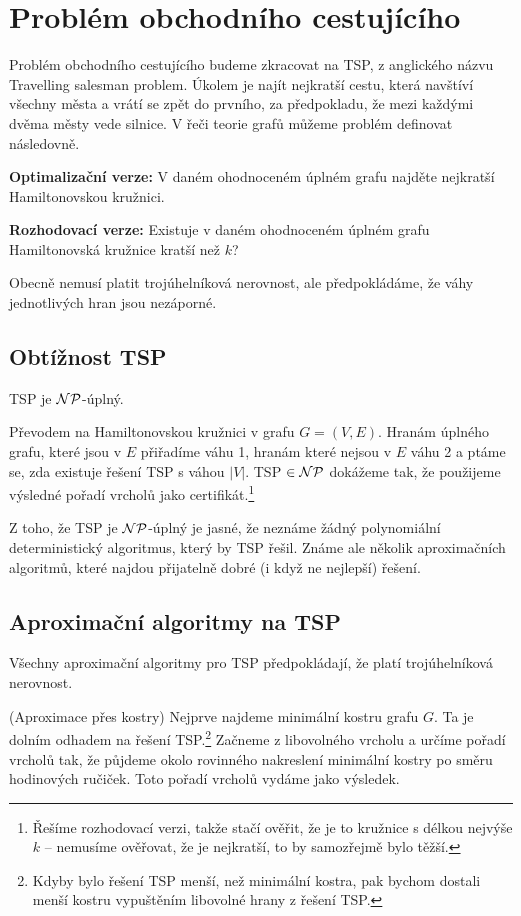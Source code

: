\section{Problém obchodního cestujícího}

Problém obchodního cestujícího budeme zkracovat na TSP, z anglického názvu
Travelling salesman problem. Úkolem je najít nejkratší cestu, která navštíví
všechny města a vrátí se zpět do prvního, za předpokladu, že mezi každými dvěma
městy vede silnice. V řeči teorie grafů můžeme problém definovat následovně.

\medskip
\noindent\textbf{Optimalizační verze:} V daném ohodnoceném úplném grafu najděte
nejkratší Hamiltonovskou kružnici. 

\noindent\textbf{Rozhodovací verze:} Existuje v daném ohodnoceném úplném grafu
Hamiltonovská kružnice kratší než $k$?
\medskip

Obecně nemusí platit trojúhelníková nerovnost, ale předpokládáme, že váhy
jednotlivých hran jsou nezáporné.

\subsection{Obtížnost TSP}

\vt TSP je $\mathcal{NP}$-úplný.

\dk Převodem na Hamiltonovskou kružnici v grafu $G = (V,E)$. Hranám úplného
grafu, které jsou v $E$ přiřadíme váhu 1, hranám které nejsou v $E$ váhu 2 a
ptáme se, zda existuje řešení TSP s váhou $|V|$. TSP $\in \mathcal{NP}$ dokážeme tak, že
použijeme výsledné pořadí vrcholů jako certifikát.\footnote{Řešíme rozhodovací
verzi, takže stačí ověřit, že je to kružnice s délkou nejvýše $k$ -- nemusíme
ověřovat, že je nejkratší, to by samozřejmě bylo těžší.}

Z toho, že TSP je $\mathcal{NP}$-úplný je jasné, že neznáme žádný polynomiální
deterministický algoritmus, který by TSP řešil. Známe ale několik aproximačních
algoritmů, které najdou přijatelně dobré (i když ne nejlepší) řešení.

\subsection{Aproximační algoritmy na TSP}

Všechny aproximační algoritmy pro TSP předpokládají, že platí trojúhelníková
nerovnost.

\alg (Aproximace přes kostry) Nejprve najdeme minimální kostru grafu $G$. Ta je
dolním odhadem na řešení TSP.\footnote{Kdyby bylo řešení TSP menší, než
minimální kostra, pak bychom dostali menší kostru vypuštěním libovolné hrany z
řešení TSP.} Začneme z libovolného vrcholu a určíme pořadí vrcholů tak, že
půjdeme okolo rovinného nakreslení minimální kostry po směru hodinových ručiček.
Toto pořadí vrcholů vydáme jako výsledek.

